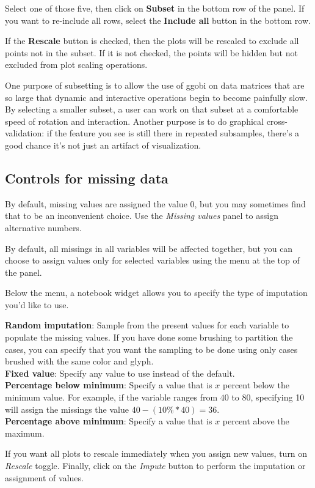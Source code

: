 \documentclass[11pt]{article}
\begin{document}
Select one of those five, then click on {\bf Subset} in the
bottom row of the panel.  If you want to re-include all rows, 
select the {\bf Include all} button in the bottom row.

If the {\bf Rescale} button is checked, then the plots will be
rescaled to exclude all points not in the subset.  If it is
not checked, the points will be hidden but not excluded from
plot scaling operations.

One purpose of subsetting is to allow the use of ggobi on data matrices
that are so large that dynamic and interactive operations begin to
become painfully slow.  By selecting a smaller subset, a user can
work on that subset at a comfortable speed of rotation and
interaction.  Another purpose is to do graphical cross-validation:
if the feature you see is still there in repeated subsamples, there's
a good chance it's not just an artifact of visualization.

\subsection{Controls for missing data}
%
By default, missing values are assigned the value $0$, but you
may sometimes find that to be an inconvenient choice.  Use the
{\em Missing values} panel to assign alternative numbers.

By default, all missings in all variables will be affected
together, but you can choose to assign values only for selected
variables using the menu at the top of the panel.

Below the menu, a notebook widget allows you to specify the
type of imputation you'd like to use.

{\bf Random imputation}: Sample from the present values for each variable
  to populate the missing values.  If you have done some brushing to
  partition the cases, you can specify that you want the sampling to be
  done using only cases brushed with the same color and glyph.
\\{\bf Fixed value}: Specify any value to use instead of the default.
\\{\bf Percentage below minimum}: Specify a value that is $x$ percent
  below the minimum value.  For example, if the variable ranges from
 $40$ to $80$, specifying 10 will assign the missings the value $40 - (10\%
 * 40) = 36$.
\\{\bf Percentage above minimum}: Specify a value that is $x$ percent
above the maximum.

If you want all plots to rescale immediately when you assign new
values, turn on {\em Rescale} toggle.  Finally, click on the {\em Impute}
button to perform the imputation or assignment of values.
\end{document}
